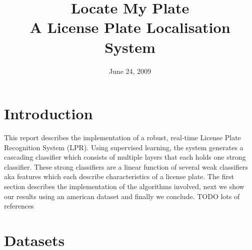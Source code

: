 \documentclass[a4paper,11pt]{article}
\title{Locate My Plate \\ A License Plate Localisation System}
\date{June 24, 2009}
\begin{document}
\maketitle
\section*{Introduction}
This report describes the implementation of a robust, real-time License Plate
Recognition System (LPR). Using supervised learning, the system generates a
cascading classifier which consists of multiple layers that each holds one
strong classifier. These strong classifiers are a linear function of several
weak classifiers aka features which each describe characteristics of a license
plate. The first section describes the implementation of the algorithms
involved, next we show our results using an american dataset and finally we
conclude.
TODO lots of references

\section*{Datasets}
\end{document}
